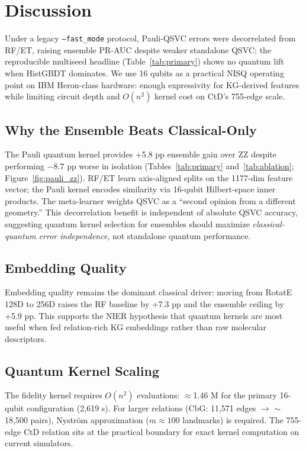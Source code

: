 \section{Discussion}

\ifqceshort
Under a legacy \texttt{--fast\_mode} protocol, Pauli-QSVC errors were
decorrelated from RF/ET, raising ensemble PR-AUC despite weaker standalone
QSVC; the reproducible multiseed headline (Table~\ref{tab:primary}) shows no
quantum lift when HistGBDT dominates.
We use 16 qubits as a practical NISQ operating point on IBM Heron-class
hardware: enough expressivity for KG-derived features while limiting circuit
depth and $O(n^2)$ kernel cost on CtD's 755-edge scale.
\else
\subsection{Why the Ensemble Beats Classical-Only}

The Pauli quantum kernel provides +5.8 pp ensemble gain over ZZ despite
performing $-8.7$ pp worse in isolation
(Tables~\ref{tab:primary} and~\ref{tab:ablation}; Figure~\ref{fig:pauli_zz}).
RF/ET learn axis-aligned splits on the 1177-dim feature vector; the Pauli
kernel encodes similarity via 16-qubit Hilbert-space inner products.
The meta-learner weights QSVC as a ``second opinion from a different geometry.''
This decorrelation benefit is independent of absolute QSVC accuracy, suggesting
quantum kernel selection for ensembles should maximize
\emph{classical-quantum error independence}, not standalone quantum performance.

\subsection{Embedding Quality}

Embedding quality remains the dominant classical driver: moving from RotatE
128D to 256D raises the RF baseline by +7.3 pp and the ensemble ceiling by
+5.9 pp. This supports the NIER hypothesis that quantum kernels are most useful
when fed relation-rich KG embeddings rather than raw molecular descriptors.

\subsection{Quantum Kernel Scaling}

The fidelity kernel requires $O(n^2)$ evaluations: ${\approx}$1.46 M for the
primary 16-qubit configuration (2,619 s).
For larger relations (CbG: 11,571 edges $\to$ ${\sim}$18,500 pairs),
Nystr\"{o}m approximation ($m\approx100$ landmarks) is required.
The 755-edge CtD relation sits at the practical boundary for exact kernel
computation on current simulators.

